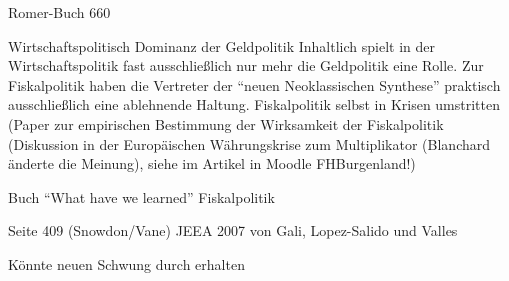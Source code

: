 Romer-Buch 660


Wirtschaftspolitisch Dominanz der Geldpolitik
Inhaltlich spielt in der Wirtschaftspolitik fast ausschließlich nur mehr die Geldpolitik eine Rolle. Zur Fiskalpolitik haben die Vertreter der "`neuen Neoklassischen Synthese"' praktisch ausschließlich eine ablehnende Haltung.
Fiskalpolitik selbst in Krisen umstritten (Paper zur empirischen Bestimmung der Wirksamkeit der Fiskalpolitik (Diskussion in der Europäischen Währungskrise zum Multiplikator (Blanchard änderte die Meinung), siehe im Artikel in Moodle FHBurgenland!)

\textcite[S. 130]{Christiano2018}



Buch "`What have we learned"'
Fiskalpolitik \textcite[S. 131]{Christiano2018}


Seite 409 (Snowdon/Vane)
\parencite{Woodford2011}
JEEA 2007 von Gali, Lopez-Salido und Valles 

Könnte neuen Schwung durch \textcite{Kaplan2018} erhalten



















